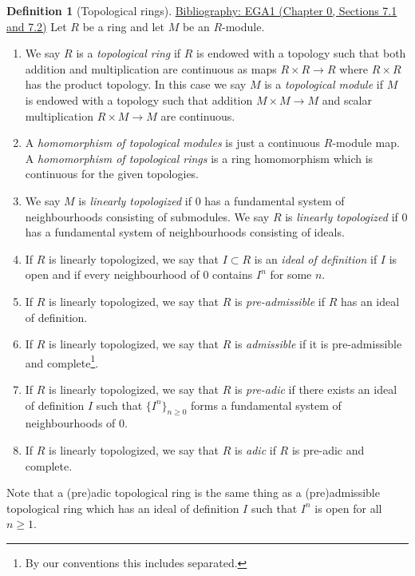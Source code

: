 \documentclass{amsart}
\newenvironment{reference}{\comment}{\endcomment}
\theoremstyle{plain}
\theoremstyle{definition}
\newtheorem{definition}[subsection]{Definition}
\theoremstyle{remark}
\numberwithin{equation}{subsection}
\begin{document}
\begin{definition}[Topological rings]
\label{more-algebra-definition-topological-ring}
\begin{reference}
\href{https://stacks.math.columbia.edu/bibliography}{Bibliography: EGA1 (Chapter 0, Sections 7.1 and 7.2)}
\end{reference}
Let $R$ be a ring and let $M$ be an $R$-module.
\begin{enumerate}
\item We say $R$ is a {\it topological ring} if $R$ is endowed with a topology
such that both addition and multiplication are continuous as maps
$R \times R \to R$ where $R \times R$ has the product topology.
In this case we say $M$ is a {\it topological module} if $M$ is endowed
with a topology such that addition $M \times M \to M$ and
scalar multiplication $R \times M \to M$ are continuous.
\item A {\it homomorphism of topological modules} is just a continuous
$R$-module map. A {\it homomorphism of topological rings} is a
ring homomorphism which is continuous for the given topologies.
\item We say $M$ is {\it linearly topologized} if $0$ has a fundamental
system of neighbourhoods consisting of submodules. We say $R$ is
{\it linearly topologized} if $0$ has a fundamental system of neighbourhoods
consisting of ideals.
\item If $R$ is linearly topologized, we say that $I \subset R$ is an
{\it ideal of definition} if $I$ is open and if every neighbourhood
of $0$ contains $I^n$ for some $n$.
\item If $R$ is linearly topologized, we say that $R$ is {\it pre-admissible}
if $R$ has an ideal of definition.
\item If $R$ is linearly topologized, we say that $R$ is {\it admissible} if
it is pre-admissible and
complete\footnote{By our conventions this includes separated.}.
\item If $R$ is linearly topologized, we say that $R$ is {\it pre-adic} if
there exists an ideal of definition $I$ such that $\{I^n\}_{n \geq 0}$
forms a fundamental system of neighbourhoods of $0$.
\item If $R$ is linearly topologized, we say that $R$ is {\it adic} if
$R$ is pre-adic and complete.
\end{enumerate}
Note that a (pre)adic topological ring is the same thing as a (pre)admissible
topological ring which has an ideal of definition $I$ such that $I^n$ is
open for all $n \geq 1$.
\end{definition}
\end{document}
